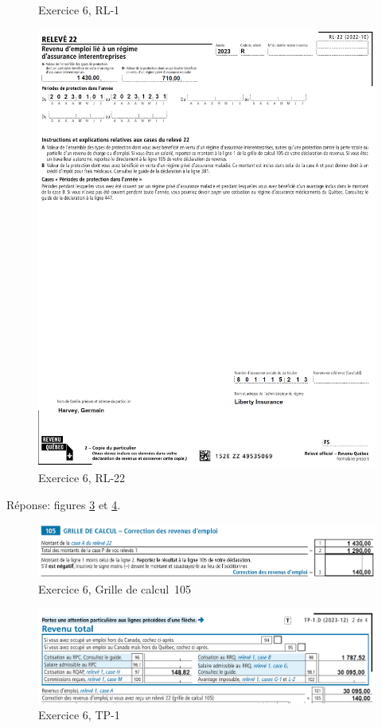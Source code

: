 \begin{sousQuestion}
\begin{figure}
		\caption[]{Exercice 6, RL-1}
		\label{fig:Chap2Exercice6Q1RL1}
	\end{figure}
	\begin{figure}
		\centering
		\includegraphics[width=.9\textwidth]{exercice/2-6/Q1/b-RL22.png}
		\caption[]{Exercice 6, RL-22}
		\label{fig:Chap2Exercice6Q1RL22}
	\end{figure}
\end{sousQuestion}
Réponse: figures \ref{fig:Chap2Exercice6Q1b105Reponse} et \ref{fig:Chap2Exercice6Q1bTP1Reponse}.
\begin{figure}
	\centering
	\includegraphics[width=.9\textwidth]{exercice/2-6/Q1/b-105-reponse.png}
	\caption[]{Exercice 6, Grille de calcul~105}
	\label{fig:Chap2Exercice6Q1b105Reponse}
\end{figure}
\begin{figure}
	\centering
	\includegraphics[width=.9\textwidth]{exercice/2-6/Q1/b-TP1-reponse.png}
	\caption[]{Exercice 6, TP-1}
	\label{fig:Chap2Exercice6Q1bTP1Reponse}
\end{figure}

